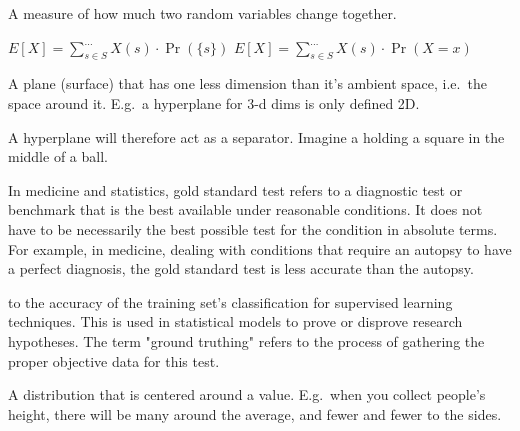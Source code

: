 \begin{definition}[Covariance]
    A measure of how much two random variables change together.

\end{definition}

\begin{definition}\label{expectedvalue}
    $E[X] = \sum\limits_{s \in S}^{\dots} X(s) \cdot \Pr(\{s\}) $ \newline
    $E[X] = \sum\limits_{s \in S}^{\dots} X(s) \cdot \Pr(X = x) $
\end{definition}

\begin{definition}[hyperplane]
    A plane (surface) that has one less dimension than it's ambient space,
    i.e.\ the space around it. E.g.\ a hyperplane for 3-d dims is only defined
    2D.

    A hyperplane will therefore act as a separator. Imagine a holding a 
    square in the middle of a ball.
\end{definition}

\begin{definition}
In medicine and statistics, gold standard test refers to a diagnostic test or
benchmark that is the best available under reasonable conditions. It does
not have to be necessarily the best possible test for the condition in absolute
terms. For example, in medicine, dealing with conditions that require an
autopsy to have a perfect diagnosis, the gold standard test is less accurate
than the autopsy.

\end{definition}

\begin{definition}
    to the accuracy of the training set's classification for supervised
    learning techniques. This is used in statistical models to prove or
    disprove research hypotheses. The term "ground truthing" refers to the
    process of gathering the proper objective data for this test.

\end{definition}

\begin{definition}
    A distribution that is centered around a value.
    E.g.\ when you collect people's height, there will be many around the
    average, and fewer and fewer to the sides.

\end{definition}

